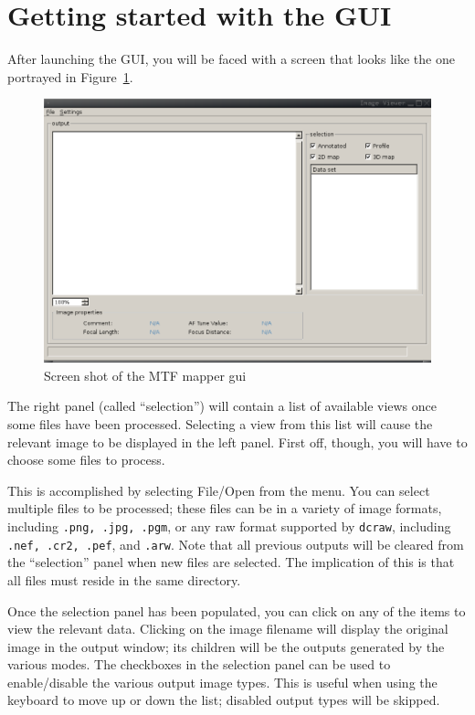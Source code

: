 \documentclass[a4paper]{article}
\begin{document}
\section{Getting started with the GUI}
After launching the GUI, you will be faced with a screen that looks like the
one portrayed in Figure~\ref{fig:sshot1}.

\begin{figure}[ht!]
\centering
\includegraphics{figures/sshot1}
\caption{Screen shot of the MTF mapper gui}
\label{fig:sshot1}
\end{figure}

The right panel (called ``selection'') will contain a list of available
views once some files have been processed. Selecting a view from this list
will cause the relevant image to be displayed in the left panel. First off,
though, you will have to choose some files to process.

This is accomplished by selecting File/Open from the menu. You can select
multiple files to be processed; these files can be in a variety of image formats,
including \texttt{.png, .jpg, .pgm}, or any raw format supported by \verb+dcraw+,
including \texttt{.nef, .cr2, .pef}, and \texttt{.arw}. Note that all
previous outputs will be cleared from the ``selection'' panel when new files are 
selected. The implication of this is that all files must reside in the same
directory.

Once the selection panel has been populated, you can click on any of the
items to view the relevant data. Clicking on the image filename will display
the original image in the output window; its children will be the outputs
generated by the various modes. The checkboxes in the selection panel can be
used to enable/disable the various output image types. This is useful when
using the keyboard to move up or down the list; disabled output types will
be skipped. 
\end{document}
